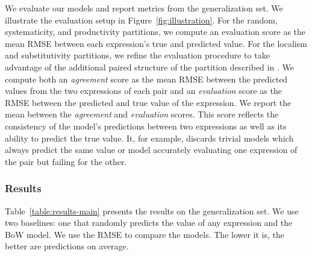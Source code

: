 We evaluate our models and report metrics from the generalization set. We illustrate the evaluation setup in Figure~\ref{fig:illustration}. For the random, systematicity, and productivity partitions, we compute an evaluation score as the mean RMSE between each expression's true and predicted value. For the localism and substitutivity partitions, we refine the evaluation procedure to take advantage of the additional paired structure of the partition described in . We compute both an \textit{agreement} score as the mean RMSE between the predicted values from the two expressions of each pair and an \textit{evaluation} score as the RMSE between the predicted and true value of the expression. We report the mean between the \textit{agreement} and \textit{evaluation} scores. This score reflects the consistency of the model's predictions between two expressions as well as its ability to predict the true value. It, for example, discards trivial models which always predict the same value or model accurately evaluating one expression of the pair but failing for the other.


\subsubsection{Results}
\label{sec:results}


Table~\ref{table:results-main} presents the results on the generalization set. We use two baselines: one that randomly predicts the value of any expression and the BoW model. We use the RMSE to compare the models. The lower it is, the better are predictions on average.

